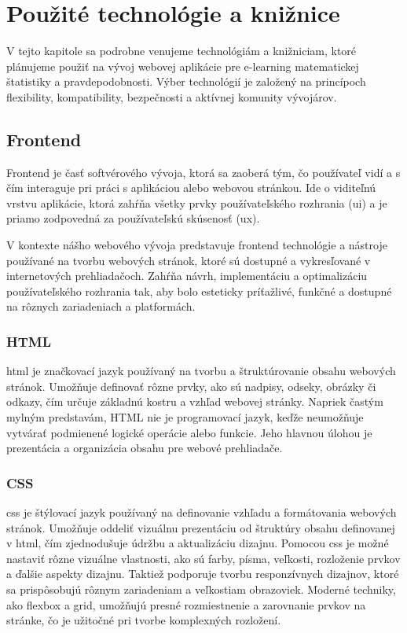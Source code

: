 \section{Použité technológie a knižnice}
V tejto kapitole sa podrobne venujeme technológiám a knižniciam, ktoré plánujeme
použiť na vývoj webovej aplikácie pre e-learning matematickej štatistiky a
pravdepodobnosti. Výber technológií je založený na princípoch flexibility,
kompatibility, bezpečnosti a aktívnej komunity vývojárov.


\subsection{Frontend}
Frontend je časť softvérového vývoja, ktorá sa zaoberá tým, čo používateľ vidí a s čím interaguje pri práci s aplikáciou alebo webovou stránkou. 
Ide o viditeľnú vrstvu aplikácie, ktorá zahŕňa všetky prvky používateľského rozhrania (\acrshort{ui}) a je priamo zodpovedná za používateľskú skúsenosť (\acrshort{ux}).

V kontexte nášho webového vývoja predstavuje frontend technológie a nástroje používané na tvorbu webových stránok, ktoré sú dostupné a vykresľované v internetových prehliadačoch. 
Zahŕňa návrh, implementáciu a optimalizáciu používateľského rozhrania tak, aby bolo esteticky príťažlivé, funkčné a dostupné na rôznych zariadeniach a platformách.
\subsubsection{HTML}
\acrfull{html} je značkovací jazyk používaný na tvorbu a štruktúrovanie obsahu webových stránok.
Umožňuje definovať rôzne prvky, ako sú nadpisy, odseky, obrázky či odkazy, čím určuje základnú kostru a vzhľad webovej stránky.
Napriek častým mylným predstavám, HTML nie je programovací jazyk, keďže neumožňuje vytvárať podmienené logické operácie alebo funkcie.
Jeho hlavnou úlohou je prezentácia a organizácia obsahu pre webové prehliadače. 
\cite{HTML}

\subsubsection{CSS}
\acrfull{css} \cite{css} je štýlovací jazyk používaný na definovanie vzhľadu a formátovania webových stránok. 
Umožňuje oddeliť vizuálnu prezentáciu od štruktúry obsahu definovanej v \acrshort{html}, čím zjednodušuje údržbu a aktualizáciu dizajnu.
Pomocou \acrshort{css} je možné nastaviť rôzne vizuálne vlastnosti, ako sú farby, písma, veľkosti, rozloženie prvkov a ďalšie aspekty dizajnu.
 Taktiež podporuje tvorbu responzívnych dizajnov, ktoré sa prispôsobujú rôznym zariadeniam a veľkostiam obrazoviek. 
 Moderné techniky, ako flexbox a grid, umožňujú presné rozmiestnenie a zarovnanie prvkov na stránke, čo je užitočné pri tvorbe komplexných rozložení.


